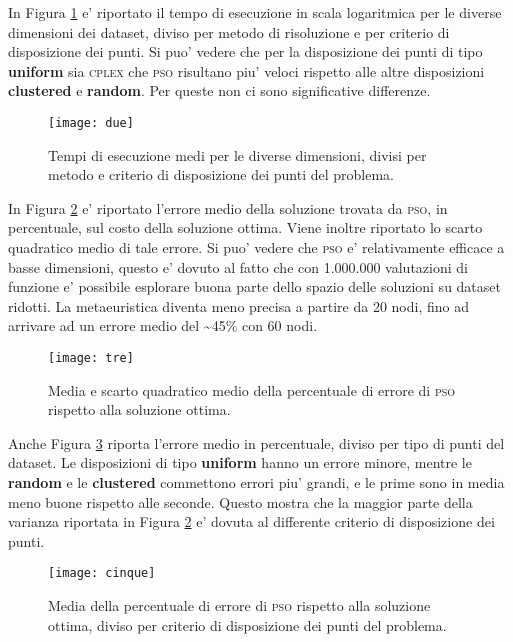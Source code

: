 \documentclass[
12pt, %
a4paper, %
oneside, %
headinclude,footinclude, %
BCOR5mm, %
]{scrartcl}
\begin{document}
In Figura \ref{fig:due} e' riportato il tempo di esecuzione in scala logaritmica per le diverse dimensioni dei dataset, diviso per metodo di risoluzione e per criterio di disposizione dei punti. Si puo' vedere che per la disposizione dei punti di tipo \textbf{uniform} sia \textsc{cplex} che \textsc{pso} risultano piu' veloci rispetto alle altre disposizioni \textbf{clustered} e \textbf{random}. Per queste non ci sono significative differenze.

\begin{figure}[htpb]
	\centering
	\texttt{[image: due]}
	\caption[]{Tempi di esecuzione medi per le diverse dimensioni, divisi per metodo e criterio di disposizione dei punti del problema. }
	\label{fig:due}
\end{figure}

In Figura \ref{fig:tre} e' riportato l'errore medio della soluzione trovata da \textsc{pso}, in percentuale, sul costo della soluzione ottima. Viene inoltre riportato lo scarto quadratico medio di tale errore. Si puo' vedere che \textsc{pso} e' relativamente efficace a basse dimensioni, questo e' dovuto al fatto che con 1.000.000 valutazioni di funzione e' possibile esplorare buona parte dello spazio delle soluzioni su dataset ridotti. La metaeuristica diventa meno precisa a partire da 20 nodi, fino ad arrivare ad un errore medio del \textasciitilde 45\% con 60 nodi.

\begin{figure}[htpb]
	\centering
	\texttt{[image: tre]}
	\caption[]{Media e scarto quadratico medio della percentuale di errore di \textsc{pso} rispetto alla soluzione ottima.}
	\label{fig:tre}
\end{figure}

Anche Figura \ref{fig:cinque} riporta l'errore medio in percentuale, diviso per tipo di punti del dataset. Le disposizioni di tipo \textbf{uniform} hanno un errore minore, mentre le \textbf{random} e le \textbf{clustered} commettono errori piu' grandi, e le prime sono in media meno buone rispetto alle seconde. Questo mostra che la maggior parte della varianza riportata in Figura \ref{fig:tre} e' dovuta al differente criterio di disposizione dei punti.

\begin{figure}[htpb]
	\centering
	\texttt{[image: cinque]}
	\caption[]{Media della percentuale di errore di \textsc{pso} rispetto alla soluzione ottima, diviso per criterio di disposizione dei punti del problema.}
	\label{fig:cinque}
\end{figure}
\end{document}
